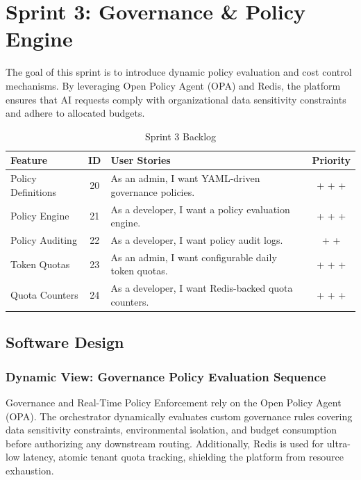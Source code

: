 \section{Sprint 3: Governance \& Policy Engine}

The goal of this sprint is to introduce dynamic policy evaluation and cost control mechanisms. By leveraging Open Policy Agent (OPA) and Redis, the platform ensures that AI requests comply with organizational data sensitivity constraints and adhere to allocated budgets.

\begin{table}[H]
\centering
\renewcommand{\arraystretch}{1.3}
\footnotesize
\begin{tabularx}{\textwidth}{| >{\raggedright\arraybackslash}p{3.5cm} | c | >{\raggedright\arraybackslash}X | c |}
\hline
\rowcolor{rowgray}
\textbf{Feature} & \textbf{ID} & \textbf{User Stories} & \textbf{Priority} \\
\hline
Policy Definitions & 20 & As an admin, I want YAML-driven governance policies. & + + + \\
\hline
Policy Engine & 21 & As a developer, I want a policy evaluation engine. & + + + \\
\hline
Policy Auditing & 22 & As a developer, I want policy audit logs. & + + \\
\hline
Token Quotas & 23 & As an admin, I want configurable daily token quotas. & + + + \\
\hline
Quota Counters & 24 & As a developer, I want Redis-backed quota counters. & + + + \\
\hline
\end{tabularx}
\caption{Sprint 3 Backlog}
\label{tab:sprint3_backlog}
\end{table}

\subsection{Software Design}

\subsubsection{Dynamic View: Governance Policy Evaluation Sequence}

Governance and Real-Time Policy Enforcement rely on the Open Policy Agent (OPA). The orchestrator dynamically evaluates custom governance rules covering data sensitivity constraints, environmental isolation, and budget consumption before authorizing any downstream routing. Additionally, Redis is used for ultra-low latency, atomic tenant quota tracking, shielding the platform from resource exhaustion.

